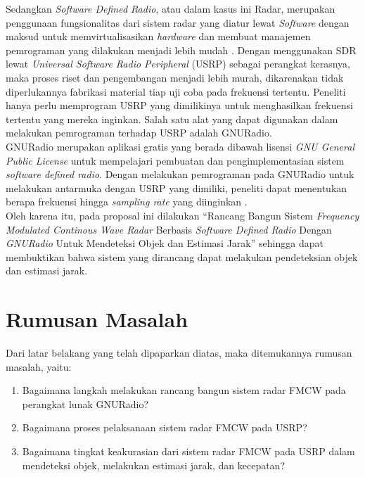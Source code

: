 Sedangkan \textit{Software Defined Radio}, atau dalam kasus ini Radar, merupakan penggunaan fungsionalitas dari sistem radar yang diatur lewat \textit{Software} dengan maksud untuk memvirtualisasikan \textit{hardware} dan membuat manajemen pemrograman yang dilakukan menjadi lebih mudah \cite{Zeng2019}. Dengan menggunakan SDR lewat \textit{Universal Software Radio Peripheral} (USRP) sebagai perangkat kerasnya, maka proses riset dan pengembangan menjadi lebih murah, dikarenakan tidak diperlukannya fabrikasi material tiap uji coba pada frekuensi tertentu. Peneliti hanya perlu memprogram USRP yang dimilikinya untuk menghasilkan frekuensi tertentu yang mereka inginkan. Salah satu alat yang dapat digunakan dalam melakukan pemrograman terhadap USRP adalah GNURadio.\\


GNURadio merupakan aplikasi gratis yang berada dibawah lisensi \textit{GNU General Public License} untuk mempelajari pembuatan dan pengimplementasian sistem \textit{software defined radio}. Dengan melakukan pemrograman pada GNURadio untuk melakukan antarmuka dengan USRP yang dimiliki, peneliti dapat menentukan berapa frekuensi hingga \textit{sampling rate} yang diinginkan \cite{Prabaswara2011}.\\


Oleh karena itu, pada proposal ini dilakukan “Rancang Bangun Sistem \textit{Frequency Modulated Continous Wave Radar }Berbasis \textit{Software Defined Radio} Dengan \textit{GNURadio }Untuk Mendeteksi Objek dan Estimasi Jarak” sehingga dapat membuktikan bahwa sistem yang dirancang dapat melakukan pendeteksian objek dan estimasi jarak.

\section{Rumusan Masalah}
Dari latar belakang yang telah dipaparkan diatas, maka ditemukannya rumusan masalah, yaitu:
\begin{enumerate}
	\item Bagaimana langkah melakukan rancang bangun sistem radar FMCW pada perangkat lunak GNURadio?
	\item Bagaimana proses pelaksanaan sistem radar FMCW pada USRP?
	\item Bagaimana tingkat keakurasian dari sistem radar FMCW pada USRP dalam mendeteksi objek, melakukan estimasi jarak, dan kecepatan?
\end{enumerate} 

